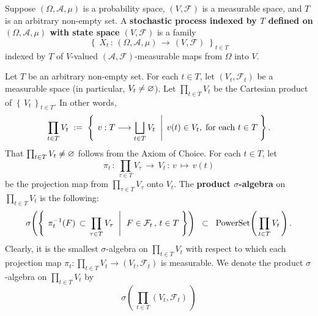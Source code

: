 \begin{definition}
\mbox{}\vskip 0.1cm
\noindent
Suppose $\left(\Omega,\mathcal{A},\mu\right)$ is a probability space,
$\left(V,\mathcal{F}\right)$ is a measurable space, and 
$T$ is an arbitrary non-empty set.
A
\textbf{stochastic process indexed by $T$ defined on $(\Omega,\mathcal{A},\mu)$
with state space $(V,\mathcal{F})$}
is a family
\begin{equation*}
\left\{\;
X_{t} \,:\, \left(\Omega,\mathcal{A},\mu\right)
\,\longrightarrow\,
\left(V,\mathcal{F}\right)
\;\right\}_{t \in T}
\end{equation*}
indexed by $T$ of $V$-valued $\left(\mathcal{A},\mathcal{F}\right)$-measurable
maps from $\Omega$ into $V$.
\end{definition}

\begin{definition}
\mbox{}\vskip 0.1cm
\noindent
Let $T$ be an arbitrary non-empty set.
For each $t \in T$, let $\left(V_{t},\mathcal{F}_{t}\right)$ be a measurable space
(in particular, $V_{t} \neq \varnothing$).
Let $\prod_{t \in T}V_{t}$ be the Cartesian product of $\left\{\,V_{t}\,\right\}_{t \in T}$.
In other words,
\begin{equation*}
\prod_{t \in T}V_{t}
\; := \;
\left\{\;
\left.
v : T \longrightarrow \bigsqcup_{t \in T}V_{t}
\;\;\right\vert\;
v(t) \in V_{t},
\;\textnormal{for each $t \in T$}
\;\right\}.
\end{equation*}
That $\prod_{t \in T}V_{t} \neq \varnothing$ follows from the Axiom of Choice.
For each $t \in T$, let
\begin{equation*}
\pi_{t} \,:\, \prod_{\tau \in T}V_{\tau} \,\longrightarrow\, V_{t} \,:\, v \, \longmapsto \, v(t)
\end{equation*}
be the projection map from $\prod_{\tau \in T}V_{\tau}$ onto $V_{t}$.
The \textbf{product $\sigma$-algebra} on $\prod_{t \in T}V_{t}$ is the following:
\begin{equation*}
\sigma\!\left(\left\{\;
\left.
\pi_{t}^{-1}\!\left(F\right) \,\subset\, \prod_{\tau \in T}V_{\tau}
\;\;\right\vert\;\,
F \in \mathcal{F}_{t} \,,\, t \in T
\;\right\}\right)
\;\; \subset \;\; \textnormal{PowerSet}\!\left(\,\prod_{t \in T}V_{t}\,\right).
\end{equation*}
Clearly, it is the smallest $\sigma$-algebra on $\prod_{t \in T}V_{t}$
with respect to which each projection map
$\pi_{t} : \prod_{t \in T}V_{t} \longrightarrow \left(V_{t},\mathcal{F}_{t}\right)$
is measurable.
We denote the product $\sigma$-algebra on $\prod_{t \in T}V_{t}$ by
\begin{equation*}
\sigma\!\left(\,\prod_{t \in T}(V_{t},\mathcal{F}_{t})\,\right)
\end{equation*}
\end{definition}

